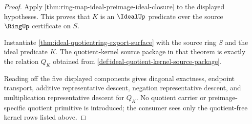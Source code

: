 \begin{proof}
Apply \autoref{thm:ring-map-ideal-preimage-ideal-closure} to the displayed hypotheses. This proves that $K$ is an $\IdealUp$ predicate over the source $\RingUp$ certificate on $S$.

Instantiate \autoref{thm:ideal-quotientring-export-surface} with the source ring $S$ and the ideal predicate $K$. The quotient-kernel source package in that theorem is exactly the relation $Q_K$ obtained from \autoref{def:ideal-quotient-kernel-source-package}.

Reading off the five displayed components gives diagonal exactness, endpoint transport, additive representative descent, negation representative descent, and multiplication representative descent for $Q_K$. No quotient carrier or preimage-specific quotient primitive is introduced; the consumer sees only the quotient-free kernel rows listed above.
\end{proof}

